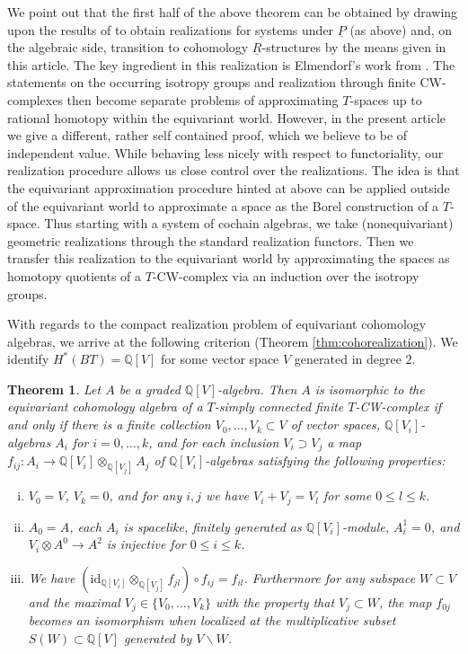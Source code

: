 \documentclass[12pt,a4paper]{article}
\newcommand{\id}{\mathrm{id}}
\newtheorem*{thm*}{Theorem}
\theoremstyle{definition}
\begin{document}
We point out that the first half of the above theorem can be obtained by drawing upon the results of \cite{ScullMendes} to obtain realizations for systems under $\underline{P}$ (as above) and, on the algebraic side, transition to cohomology $\underline{R}$-structures by the means given in this article. The key ingredient in this realization is Elmendorf's work from \cite{Elmendorf}. The statements on the occurring isotropy groups and realization through finite CW-complexes then become separate problems of approximating $T$-spaces up to rational homotopy within the equivariant world. However, in the present article we give a different, rather self contained proof, which we believe to be of independent value. While behaving less nicely with respect to functoriality, our realization procedure allows us close control over the realizations. The idea is that the equivariant approximation procedure hinted at above can be applied outside of the equivariant world to approximate a space as the Borel construction of a $T$-space. Thus starting with a system of cochain algebras, we take (nonequivariant) geometric realizations through the standard realization functors. Then we transfer this realization to the equivariant world by approximating the spaces as homotopy quotients of a $T$-CW-complex via an induction over the isotropy groups.

With regards to the compact realization problem of equivariant cohomology algebras, we arrive at the following criterion (Theorem \ref{thm:cohorealization}). We identify $H^*(BT)=\mathbb{Q}[V]$ for some vector space $V$ generated in degree $2$.

\begin{thm*}
Let $A$ be a graded $\mathbb{Q}[V]$-algebra. Then $A$ is isomorphic to the equivariant cohomology algebra of a $T$-simply connected finite $T$-CW-complex if and only if there is a finite collection $V_0,\ldots, V_k\subset V$ of vector spaces, $\mathbb{Q}[V_i]$-algebras $A_i$ for $i=0,\ldots,k$, and for each inclusion $V_i\supset V_j$ a map $f_{ij}\colon A_i\rightarrow \mathbb{Q}[V_i] \otimes_{\mathbb{Q}[V_j]} A_j$ of $\mathbb{Q}[V_i]$-algebras satisfying the following properties:
\begin{enumerate}[(i)]
\item  $V_0=V$, $V_k=0$, and for any $i,j$ we have $V_i+ V_j=V_l$ for some $0\leq l\leq k$.
\item $A_0=A$, each $A_i$ is spacelike, finitely generated as $\mathbb{Q}[V_i]$-module, $A_i^1=0$, and $V_i\otimes A^0\rightarrow A^2$ is injective for $0\leq i \leq k$.
\item We have $(\id_{\mathbb{Q}[V_i]}\otimes_{\mathbb{Q}[V_j]} f_{jl})\circ f_{ij}=f_{il}$. Furthermore for any subspace $W\subset V$ and the maximal $V_j\in\{V_0,\ldots,V_k\}$ with the property that $V_j\subset W$, the map $f_{0j}$ becomes an isomorphism when localized at the multiplicative subset $S(W)\subset \mathbb{Q}[V]$  generated by $V\backslash W$.
\end{enumerate}
\end{thm*}
\end{document}
